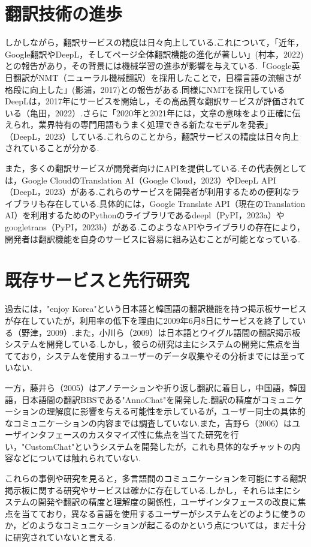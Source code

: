 \documentclass[b5paper,12pt,dvipdfmx]{jsreport}
\begin{document}
\section{翻訳技術の進歩}

しかしながら，翻訳サービスの精度は日々向上している.これについて，「近年，Google翻訳やDeepL，そしてページ全体翻訳機能の進化が著しい」(村本，2022)との報告があり，その背景には機械学習の進歩が影響を与えている.「Google英日翻訳がNMT（ニューラル機械翻訳）を採用したことで，目標言語の流暢さが格段に向上した」(影浦，2017)との報告がある.同様にNMTを採用しているDeepLは，2017年にサービスを開始し，その高品質な翻訳サービスが評価されている（亀田，2022）.さらに「2020年と2021年には，文章の意味をより正確に伝えられ，業界特有の専門用語もうまく処理できる新たなモデルを発表」（DeepL，2023）している.これらのことから，翻訳サービスの精度は日々向上されていることが分かる.

また，多くの翻訳サービスが開発者向けにAPIを提供している.その代表例としては，Google CloudのTranslation AI（Google Cloud，2023）やDeepL API（DeepL，2023）がある.これらのサービスを開発者が利用するための便利なライブラリも存在している.具体的には，Google Translate API（現在のTranslation AI）を利用するためのPythonのライブラリであるdeepl（PyPI，2023a）やgoogletrans（PyPI，2023b）がある.このようなAPIやライブラリの存在により，開発者は翻訳機能を自身のサービスに容易に組み込むことが可能となっている.

\section{既存サービスと先行研究}

過去には，"enjoy Korea"という日本語と韓国語の翻訳機能を持つ掲示板サービスが存在していたが，利用率の低下を理由に2009年6月8日にサービスを終了している（野津，2009）.また，小川ら（2009）は日本語とウイグル語間の翻訳掲示板システムを開発している.しかし，彼らの研究は主にシステムの開発に焦点を当てており，システムを使用するユーザーのデータ収集やその分析までには至っていない.

一方，藤井ら（2005）はアノテーションや折り返し翻訳に着目し，中国語，韓国語，日本語間の翻訳BBSである"AnnoChat"を開発した.翻訳の精度がコミュニケーションの理解度に影響を与える可能性を示しているが，ユーザー同士の具体的なコミュニケーションの内容までは調査していない.また，吉野ら（2006）はユーザインタフェースのカスタマイズ性に焦点を当てた研究を行い，"CustomChat"というシステムを開発したが，これも具体的なチャットの内容などについては触れられていない.

これらの事例や研究を見ると，多言語間のコミュニケーションを可能にする翻訳掲示板に関する研究やサービスは確かに存在している.しかし，それらは主にシステムの開発や翻訳の精度と理解度の関係性，ユーザインタフェースの改良に焦点を当てており，異なる言語を使用するユーザーがシステムをどのように使うのか，どのようなコミュニケーションが起こるのかという点については，まだ十分に研究されていないと言える.
\end{document}
